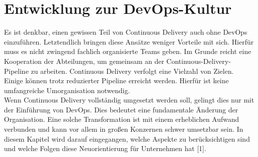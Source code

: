 \section{Entwicklung zur DevOps-Kultur} \label{entwicklung}
Es ist denkbar, einen gewissen Teil von Continuous Delivery auch ohne DevOps einzuführen. Letztendlich bringen diese Ansätze weniger Vorteile mit sich. Hierfür muss es nicht zwingend fachlich organisierte Teams geben. Im Grunde reicht eine Kooperation der Abteilungen, um gemeinsam an der Continuous-Delivery-Pipeline zu arbeiten. Continuous Delivery verfolgt eine Vielzahl von Zielen. Einige können trotz reduzierter Pipeline erreicht werden. Hierfür ist keine umfangreiche Umorganisation notwendig.\\ Wenn Continuous Delivery vollständig umgesetzt werden soll, gelingt dies nur mit der Einführung von DevOps. Dies bedeutet eine fundamentale Änderung der Organisation. Eine solche Transformation ist mit einem erheblichen Aufwand verbunden und kann vor allem in großen Konzernen schwer umsetzbar sein. In diesem Kapitel wird darauf eingegangen, welche Aspekte zu berücksichtigen sind und welche Folgen diese Neuorientierung für Unternehmen hat [1].

